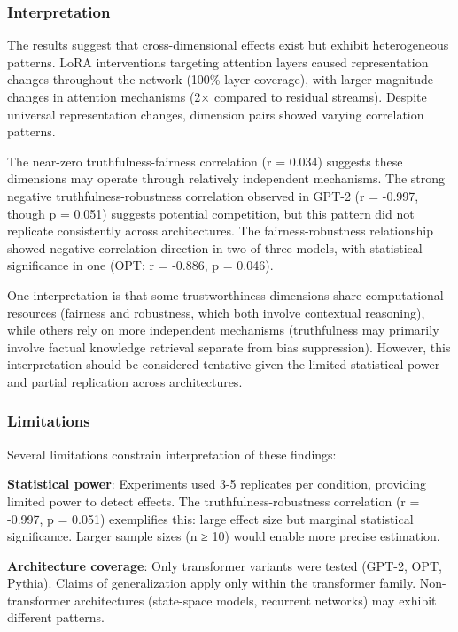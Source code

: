 
\subsubsection{Interpretation}

The results suggest that cross-dimensional effects exist but exhibit heterogeneous patterns. LoRA interventions targeting attention layers caused representation changes throughout the network (100\% layer coverage), with larger magnitude changes in attention mechanisms (2× compared to residual streams). Despite universal representation changes, dimension pairs showed varying correlation patterns.

The near-zero truthfulness-fairness correlation (r = 0.034) suggests these dimensions may operate through relatively independent mechanisms. The strong negative truthfulness-robustness correlation observed in GPT-2 (r = -0.997, though p = 0.051) suggests potential competition, but this pattern did not replicate consistently across architectures. The fairness-robustness relationship showed negative correlation direction in two of three models, with statistical significance in one (OPT: r = -0.886, p = 0.046).

One interpretation is that some trustworthiness dimensions share computational resources (fairness and robustness, which both involve contextual reasoning), while others rely on more independent mechanisms (truthfulness may primarily involve factual knowledge retrieval separate from bias suppression). However, this interpretation should be considered tentative given the limited statistical power and partial replication across architectures.

\subsubsection{Limitations}

Several limitations constrain interpretation of these findings:

\textbf{Statistical power}: Experiments used 3-5 replicates per condition, providing limited power to detect effects. The truthfulness-robustness correlation (r = -0.997, p = 0.051) exemplifies this: large effect size but marginal statistical significance. Larger sample sizes (n ≥ 10) would enable more precise estimation.

\textbf{Architecture coverage}: Only transformer variants were tested (GPT-2, OPT, Pythia). Claims of generalization apply only within the transformer family. Non-transformer architectures (state-space models, recurrent networks) may exhibit different patterns.

